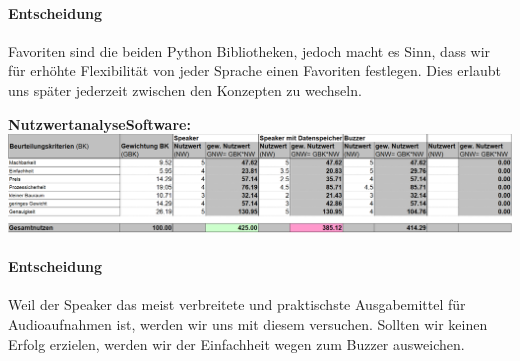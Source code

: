 \documentclass[../../../main.tex]{subfiles}
\begin{document}
    \paragraph{Entscheidung}
    Favoriten sind die beiden Python Bibliotheken, jedoch macht es Sinn, dass wir für erhöhte Flexibilität von jeder Sprache einen Favoriten festlegen. Dies erlaubt uns später jederzeit zwischen den Konzepten zu wechseln.

    \textbf{NutzwertanalyseSoftware:}\\
    \includegraphics{Akustik/NutzwertanalyseAkustikHardware}
    \paragraph{Entscheidung}
    Weil der Speaker das meist verbreitete und praktischste Ausgabemittel für Audioaufnahmen ist, werden wir uns mit diesem versuchen.
    Sollten wir keinen Erfolg erzielen, werden wir der Einfachheit wegen zum Buzzer ausweichen.


  
\end{document}
